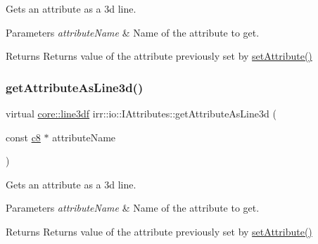 Gets an attribute as a 3d line. 


\begin{DoxyParams}{Parameters}
{\em attribute\+Name} & Name of the attribute to get. \\
\hline
\end{DoxyParams}
\begin{DoxyReturn}{Returns}
Returns value of the attribute previously set by \hyperlink{classirr_1_1io_1_1IAttributes_a03fa31acb481ae23678676cc183f09a6}{set\+Attribute()} 
\end{DoxyReturn}
\mbox{\label{classirr_1_1io_1_1IAttributes_ab6da415d43f2a4211026b191b17b0938}} 
\subsubsection{\texorpdfstring{get\+Attribute\+As\+Line3d()}{getAttributeAsLine3d()}\hspace{0.1cm}{\footnotesize\ttfamily [2/4]}}
{\footnotesize\ttfamily virtual \hyperlink{namespaceirr_1_1core_acadb288f9aca3bf2d1222abcdf77114e}{core\+::line3df} irr\+::io\+::\+I\+Attributes\+::get\+Attribute\+As\+Line3d (\begin{DoxyParamCaption}\item[{const \hyperlink{namespaceirr_a9395eaea339bcb546b319e9c96bf7410}{c8} $\ast$}]{attribute\+Name }\end{DoxyParamCaption})\hspace{0.3cm}{\ttfamily [pure virtual]}}



Gets an attribute as a 3d line. 


\begin{DoxyParams}{Parameters}
{\em attribute\+Name} & Name of the attribute to get. \\
\hline
\end{DoxyParams}
\begin{DoxyReturn}{Returns}
Returns value of the attribute previously set by \hyperlink{classirr_1_1io_1_1IAttributes_a03fa31acb481ae23678676cc183f09a6}{set\+Attribute()} 
\end{DoxyReturn}
\mbox{\label{classirr_1_1io_1_1IAttributes_ab6cc3141c7d5bd82ade97c7da899d025}} 
